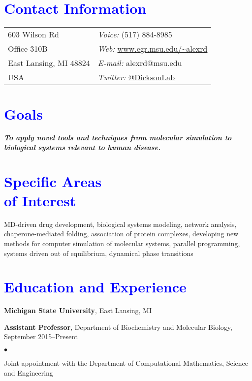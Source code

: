 \documentclass[margin,line]{res}
\newenvironment{list1}{
  \begin{list}{\ding{113}}{%
      \setlength{\itemsep}{0.05in}
      \setlength{\parsep}{0in} \setlength{\parskip}{0in}
      \setlength{\topsep}{0in} \setlength{\partopsep}{0in} 
      \setlength{\leftmargin}{0.17in}}}{\end{list}}
\newenvironment{list2}{
  \begin{list}{$\bullet$}{%
      \setlength{\itemsep}{0.03in}
      \setlength{\parsep}{0in} \setlength{\parskip}{0in}
      \setlength{\topsep}{0.05in} \setlength{\partopsep}{0in} 
      \setlength{\leftmargin}{0.2in}}}{\end{list}}
\begin{document}

\begin{resume}
\section{\sc \textcolor{blue}{Contact Information}}
\vspace{.05in}
\begin{tabular}{@{}p{2in}p{4in}}
603 Wilson Rd             & {\it Voice:}  (517) 884-8985 \\            
Office 310B               & {\it Web:} \url{www.egr.msu.edu/~alexrd} \\         
East Lansing, MI 48824  & {\it E-mail:}  alexrd@msu.edu\\
USA & {\it Twitter:} \url{@DicksonLab}\\
\end{tabular}

\section{\sc \textcolor{blue}{ Goals}}
{\bf{\emph{To apply novel tools and techniques from molecular simulation to biological systems relevant to human disease.}}}

\section{\sc \textcolor{blue}{ Specific Areas \\ of Interest}}
MD-driven drug development, biological systems modeling, network analysis, chaperone-mediated folding,
association of protein complexes, developing new methods for computer simulation of molecular systems, parallel programming, systems driven out of equilibrium, dynamical phase transitions

\section{\sc \textcolor{blue}{ Education and Experience}}
{\bf Michigan State University}, East Lansing, MI\\
\vspace {-0.05in}
\begin{list1}
\item[] {\bf Assistant Professor}, Department of Biochemistry and Molecular Biology, September 2015--Present
\begin{list2}
\item {Joint appointment with the Department of Computational Mathematics, Science and Engineering}
\end{list2}
\end{list1}


\end{resume}
\end{document}
